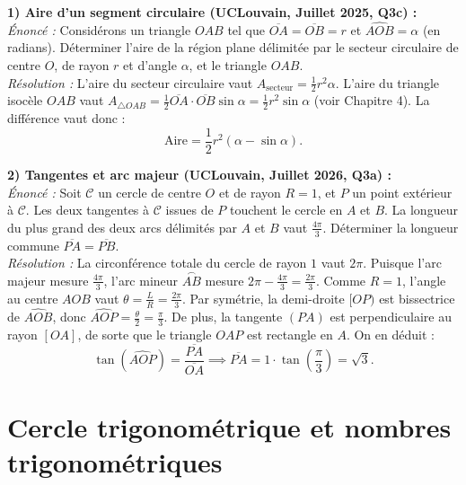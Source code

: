 \begin{exemple}
\textbf{1) Aire d'un segment circulaire (UCLouvain, Juillet 2025, Q3c) :}\\
\emph{Énoncé :} Considérons un triangle $OAB$ tel que $\overline{OA} = \overline{OB} = r$ et $\widehat{AOB} = \alpha$ (en radians). Déterminer l'aire de la région plane délimitée par le secteur circulaire de centre $O$, de rayon $r$ et d'angle $\alpha$, et le triangle $OAB$.\\
\emph{Résolution :} L'aire du secteur circulaire vaut $A_{\text{secteur}} = \frac{1}{2}r^2\alpha$. L'aire du triangle isocèle $OAB$ vaut $A_{\triangle OAB} = \frac{1}{2}\overline{OA}\cdot\overline{OB}\sin\alpha = \frac{1}{2}r^2\sin\alpha$ (voir Chapitre 4). La différence vaut donc :
\[
    \text{Aire} = \frac{1}{2}r^2(\alpha - \sin\alpha).
\]

\medskip
\textbf{2) Tangentes et arc majeur (UCLouvain, Juillet 2026, Q3a) :}\\
\emph{Énoncé :} Soit $\mathcal{C}$ un cercle de centre $O$ et de rayon $R=1$, et $P$ un point extérieur à $\mathcal{C}$. Les deux tangentes à $\mathcal{C}$ issues de $P$ touchent le cercle en $A$ et $B$. La longueur du plus grand des deux arcs délimités par $A$ et $B$ vaut $\frac{4\pi}{3}$. Déterminer la longueur commune $\overline{PA} = \overline{PB}$.\\
\emph{Résolution :} La circonférence totale du cercle de rayon $1$ vaut $2\pi$. Puisque l'arc majeur mesure $\frac{4\pi}{3}$, l'arc mineur $\overset{\frown}{AB}$ mesure $2\pi - \frac{4\pi}{3} = \frac{2\pi}{3}$. Comme $R=1$, l'angle au centre $\widehat{AOB}$ vaut $\theta = \frac{L}{R} = \frac{2\pi}{3}$.
Par symétrie, la demi-droite $[OP)$ est bissectrice de $\widehat{AOB}$, donc $\widehat{AOP} = \frac{\theta}{2} = \frac{\pi}{3}$. De plus, la tangente $(PA)$ est perpendiculaire au rayon $[OA]$, de sorte que le triangle $OAP$ est rectangle en $A$. On en déduit :
\[
    \tan\left(\widehat{AOP}\right) = \frac{\overline{PA}}{\overline{OA}} \implies \overline{PA} = 1 \cdot \tan\left(\frac{\pi}{3}\right) = \sqrt{3}.
\]
\end{exemple}

\section{Cercle trigonométrique et nombres trigonométriques}

